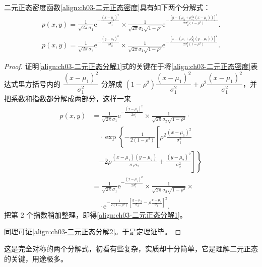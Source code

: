 \documentclass[../../main.tex]{subfiles}
\begin{document}
\begin{theorem}[二元正态密度的典型分解]\label{theorem:ch03-二元正态典型分解}
二元正态密度函数\eqref{align:ch03-二元正态密度}具有如下两个分解式：
\begin{align}
p(x,y)=\frac{1}{\sqrt{2\pi}\sigma_1}\mathrm{e}^{-\frac{(x-\mu_1)^{2}}{2\sigma_1^{2}}}\times\frac{1}{\sqrt{2\pi}\sigma_2\sqrt{1-\rho^{2}}}\mathrm{e}^{-\frac{\left[y-\left(\mu_2+\rho\frac{\sigma_2}{\sigma_1}(x-\mu_1)\right)\right]^{2}}{2\sigma_2^{2}(1-\rho^{2})}}.\label{align:ch03-二元正态分解1}
\end{align}
\begin{align}
p(x,y)=\frac{1}{\sqrt{2\pi}\sigma_2}\mathrm{e}^{-\frac{(y-\mu_2)^{2}}{2\sigma_2^{2}}}\times\frac{1}{\sqrt{2\pi}\sigma_1\sqrt{1-\rho^{2}}}\mathrm{e}^{-\frac{\left[x-\left(\mu_1+\rho\frac{\sigma_1}{\sigma_2}(y-\mu_2)\right)\right]^{2}}{2\sigma_1^{2}(1-\rho^{2})}}.\label{align:ch03-二元正态分解2}
\end{align}
\end{theorem}

\begin{proof}
证明\eqref{align:ch03-二元正态分解1}式的关键在于将\eqref{align:ch03-二元正态密度}表达式里方括号内的 $\dfrac{(x-\mu_1)^{2}}{\sigma_1^{2}}$ 分解成 $(1-\rho^{2})\dfrac{(x-\mu_1)^{2}}{\sigma_1^{2}}+\rho^{2}\dfrac{(x-\mu_1)^{2}}{\sigma_1^{2}}$，并把系数和指数都分解成两部分，这样一来
\begin{align*}
p(x,y)&=\frac{1}{\sqrt{2\pi}\sigma_1}\mathrm{e}^{-\frac{(x-\mu_1)^{2}}{2\sigma_1^{2}}}\times\frac{1}{\sqrt{2\pi}\sigma_2\sqrt{1-\rho^{2}}}\cdot\\
&\quad\cdot\exp\left\{-\frac{1}{2(1-\rho^{2})}\left[\rho^{2}\frac{(x-\mu_1)^{2}}{\sigma_1^{2}}\right.\right.\\
&\quad\left.\left.-2\rho\frac{(x-\mu_1)(y-\mu_2)}{\sigma_1\sigma_2}+\frac{(y-\mu_2)^{2}}{\sigma_2^{2}}\right]\right\}\\
&=\frac{1}{\sqrt{2\pi}\sigma_1}\mathrm{e}^{-\frac{(x-\mu_1)^{2}}{2\sigma_1^{2}}}\times\frac{1}{\sqrt{2\pi}\sigma_2\sqrt{1-\rho^{2}}}\times\\
&\quad\cdot\mathrm{e}^{-\frac{1}{2(1-\rho^{2})}\left[\frac{y-\mu_2}{\sigma_2}-\rho\frac{x-\mu_1}{\sigma_1}\right]^{2}}.
\end{align*}
把第 $2$ 个指数稍加整理，即得\eqref{align:ch03-二元正态分解1}。

同理可证\eqref{align:ch03-二元正态分解2}。于是定理证毕。
\end{proof}

这是完全对称的两个分解式，初看有些复杂，实质却十分简单，它是理解二元正态的关键，用途极多。
\end{document}
